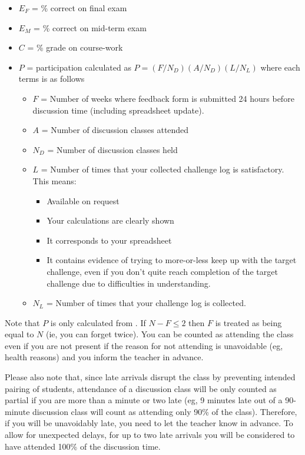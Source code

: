 \begin{itemize}
    \item $E_F$ = \% correct on final exam
    \item $E_M$ = \% correct on mid-term exam
    \item $C$ = \% grade on course-work
    \item $P$ = participation calculated as $P = (F/N_D)(A/N_D)(L/N_L)$ where each terms is as follows
        \begin{itemize}
            \item $F$ = Number of weeks where feedback form is submitted 24 hours before discussion time (including spreadsheet update).
            \item $A$ = Number of discussion classes attended
            \item $N_D$ = Number of discussion classes held
            \item $L$ = Number of times that your collected challenge log is satisfactory. This means:
                \begin{itemize}
                    \item Available on request
                    \item Your calculations are clearly shown
                    \item It corresponds to your spreadsheet
                    \item It contains evidence of trying to more-or-less keep up with the target challenge, even if you don't quite reach completion of the target challenge due to difficulties in understanding.
                \end{itemize}
            \item $N_L$ = Number of times that your challenge log is collected.
        \end{itemize}
\end{itemize}

Note that $P$ is only calculated from \assstart. If $N - F \le 2$ then $F$ is treated as being equal to $N$ (ie, you can forget twice). You can be counted as attending the class even if you are not present if the reason for not attending is unavoidable (eg, health reasons) and you inform the teacher in advance.

Please also note that, since late arrivals disrupt the class by preventing intended pairing of students, attendance of a discussion class will be only counted as partial if you are more than a minute or two late (eg, 9 minutes late out of a 90-minute discussion class will count as attending only 90\% of the class). Therefore, if you will be unavoidably late, you need to let the teacher know in advance. To allow for unexpected delays, for up to two late arrivals you will be considered to have attended 100\% of the discussion time.

